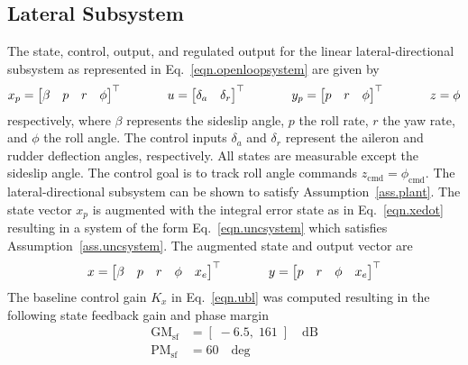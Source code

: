 \documentclass[]{../sty/JGCD}
\theoremstyle{examplestyle}
\begin{document}
  \subsection{Lateral Subsystem}

  The state, control, output, and regulated output for the linear lateral-directional subsystem as represented in Eq.\ \eqref{eqn.openloopsystem} are given by
  \begin{equation*}
    x_{p}=
    \begin{bmatrix}
      \beta & p & r & \phi
    \end{bmatrix}^{\top}
    \hspace{0.5in}
    u=
    \begin{bmatrix}
      \delta_{a} & \delta_{r}
    \end{bmatrix}^{\top}
    \hspace{0.5in}
    y_{p}=
    \begin{bmatrix}
      p & r & \phi
    \end{bmatrix}^{\top}
    \hspace{0.5in}
    z=\phi
  \end{equation*}
  respectively, where $\beta$ represents the sideslip angle, $p$ the roll rate, $r$ the yaw rate, and $\phi$ the roll angle.
  The control inputs $\delta_{a}$ and $\delta_{r}$ represent the aileron and rudder deflection angles, respectively.
  All states are measurable except the sideslip angle.
  The control goal is to track roll angle commands $z_{\text{cmd}}=\phi_{\text{cmd}}$.
  The lateral-directional subsystem can be shown to satisfy Assumption~\ref{ass.plant}.
  The state vector $x_{p}$ is augmented with the integral error state as in Eq.\ \eqref{eqn.xedot} resulting in a system of the form Eq.\ \eqref{eqn.uncsystem} which satisfies Assumption~\ref{ass.uncsystem}.
  The augmented state and output vector are
  \begin{equation*}
    x=
    \begin{bmatrix}
      \beta & p & r & \phi & x_{e}
    \end{bmatrix}^{\top}
    \hspace{0.5in}
    y=
    \begin{bmatrix}
      p & r & \phi & x_{e}
    \end{bmatrix}^{\top}
  \end{equation*}
  The baseline control gain $K_{x}$ in Eq.\ \eqref{eqn.ubl} was computed resulting in the following state feedback gain and phase margin
  \begin{align*}
    \text{GM}_{\text{sf}}&=[\;-6.5,\; 161\;] \quad \text{dB}\\
    \text{PM}_{\text{sf}}&=60 \quad \text{deg}
  \end{align*}
\end{document}
